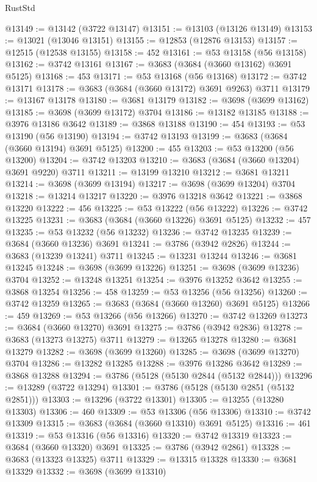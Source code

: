 \begin{lexlean}{RustStd}
\begin{coremodule}
@13149 := @13142 (@3722 @13147)
@13151 := @13103 (@13126 @13149)
@13153 := @13021 (@13046 @13151)
@13155 := @12853 (@12876 @13153)
@13157 := @12515 (@12538 @13155)
@13158 := 452
@13161 := @53 @13158 (@56 @13158)
@13162 := @3742 @13161
@13167 := @3683 (@3684 (@3660 @13162) @3691 @5125)
@13168 := 453
@13171 := @53 @13168 (@56 @13168)
@13172 := @3742 @13171
@13178 := @3683 (@3684 (@3660 @13172) @3691 @9263) @3711
@13179 := @13167 @13178
@13180 := @3681 @13179
@13182 := @3698 (@3699 @13162)
@13185 := @3698 (@3699 @13172) @3704
@13186 := @13182 @13185
@13188 := @3976 @13186 @3642
@13189 := @3868 @13188
@13190 := 454
@13193 := @53 @13190 (@56 @13190)
@13194 := @3742 @13193
@13199 := @3683 (@3684 (@3660 @13194) @3691 @5125)
@13200 := 455
@13203 := @53 @13200 (@56 @13200)
@13204 := @3742 @13203
@13210 := @3683 (@3684 (@3660 @13204) @3691 @9220) @3711
@13211 := @13199 @13210
@13212 := @3681 @13211
@13214 := @3698 (@3699 @13194)
@13217 := @3698 (@3699 @13204) @3704
@13218 := @13214 @13217
@13220 := @3976 @13218 @3642
@13221 := @3868 @13220
@13222 := 456
@13225 := @53 @13222 (@56 @13222)
@13226 := @3742 @13225
@13231 := @3683 (@3684 (@3660 @13226) @3691 @5125)
@13232 := 457
@13235 := @53 @13232 (@56 @13232)
@13236 := @3742 @13235
@13239 := @3684 (@3660 @13236) @3691
@13241 := @3786 (@3942 @2826)
@13244 := @3683 (@13239 @13241) @3711
@13245 := @13231 @13244
@13246 := @3681 @13245
@13248 := @3698 (@3699 @13226)
@13251 := @3698 (@3699 @13236) @3704
@13252 := @13248 @13251
@13254 := @3976 @13252 @3642
@13255 := @3868 @13254
@13256 := 458
@13259 := @53 @13256 (@56 @13256)
@13260 := @3742 @13259
@13265 := @3683 (@3684 (@3660 @13260) @3691 @5125)
@13266 := 459
@13269 := @53 @13266 (@56 @13266)
@13270 := @3742 @13269
@13273 := @3684 (@3660 @13270) @3691
@13275 := @3786 (@3942 @2836)
@13278 := @3683 (@13273 @13275) @3711
@13279 := @13265 @13278
@13280 := @3681 @13279
@13282 := @3698 (@3699 @13260)
@13285 := @3698 (@3699 @13270) @3704
@13286 := @13282 @13285
@13288 := @3976 @13286 @3642
@13289 := @3868 @13288
@13294 := @3786 (@5128 (@5130 @2844 (@5132 @2844)))
@13296 := @13289 (@3722 @13294)
@13301 := @3786 (@5128 (@5130 @2851 (@5132 @2851)))
@13303 := @13296 (@3722 @13301)
@13305 := @13255 (@13280 @13303)
@13306 := 460
@13309 := @53 @13306 (@56 @13306)
@13310 := @3742 @13309
@13315 := @3683 (@3684 (@3660 @13310) @3691 @5125)
@13316 := 461
@13319 := @53 @13316 (@56 @13316)
@13320 := @3742 @13319
@13323 := @3684 (@3660 @13320) @3691
@13325 := @3786 (@3942 @2861)
@13328 := @3683 (@13323 @13325) @3711
@13329 := @13315 @13328
@13330 := @3681 @13329
@13332 := @3698 (@3699 @13310)

\end{coremodule}
\end{lexlean}
